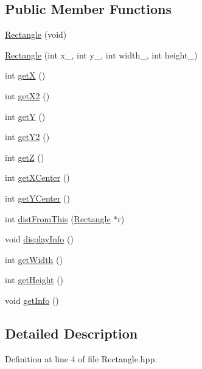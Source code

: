 \subsection*{Public Member Functions}
\begin{DoxyCompactItemize}
\item 
\hyperlink{class_rectangle_a866760724f805218b903fb7b1e7f98f2}{Rectangle} (void)
\item 
\hyperlink{class_rectangle_a7fcaa922b857b6227564a37e1dd02f10}{Rectangle} (int x\-\_\-, int y\-\_\-, int width\-\_\-, int height\-\_\-)
\item 
int \hyperlink{class_rectangle_ae86cd7935f459ab5688426022c8d370b}{get\-X} ()
\item 
int \hyperlink{class_rectangle_a444cd246f7ef29ba99e63886c2359aa8}{get\-X2} ()
\item 
int \hyperlink{class_rectangle_a83fce04292b258f2a7b1fab5b92cef00}{get\-Y} ()
\item 
int \hyperlink{class_rectangle_a1741ab93a0a29aaa0d9f0c61ba3d207f}{get\-Y2} ()
\item 
int \hyperlink{class_rectangle_aa30d1f1de13cb468ddbc065e814e71da}{get\-Z} ()
\item 
int \hyperlink{class_rectangle_a8ff14bdc40239b5a60f940c4e1bd8910}{get\-X\-Center} ()
\item 
int \hyperlink{class_rectangle_a0c015828297db4418109f38572ecbe94}{get\-Y\-Center} ()
\item 
int \hyperlink{class_rectangle_a8ac164b422072b4b60de559a2f0521c7}{dist\-From\-This} (\hyperlink{class_rectangle}{Rectangle} $\ast$r)
\item 
void \hyperlink{class_rectangle_a5611b369fa23da80daea6629061c7758}{display\-Info} ()
\item 
int \hyperlink{class_rectangle_ab750e4f0666df9c303ad649342bf3efd}{get\-Width} ()
\item 
int \hyperlink{class_rectangle_a9b6909485e6cc6e33717c6fba0d29761}{get\-Height} ()
\item 
void \hyperlink{class_rectangle_a6a293d96bf13d01b78dfa9d2123e4926}{get\-Info} ()
\end{DoxyCompactItemize}


\subsection{Detailed Description}


Definition at line 4 of file Rectangle.\-hpp.



